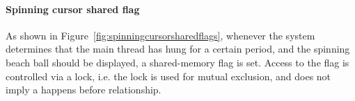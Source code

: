 
\paragraph{Spinning cursor shared flag}
As shown in Figure~\ref{fig:spinningcursorsharedflags},
whenever the system determines that the main thread has hung for a certain
period, and the spinning beach ball should be displayed, a shared-memory flag
is set. Access to the flag is controlled via a lock, i.e. the lock is used for
mutual exclusion, and does not imply a happens before relationship.

